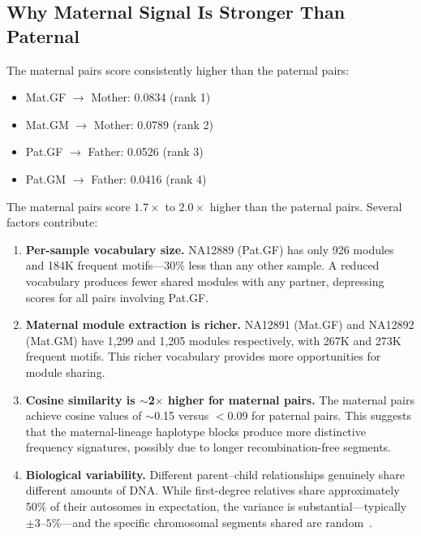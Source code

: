 \documentclass{../yalumba}
\begin{document}
\subsection{Why Maternal Signal Is Stronger Than Paternal}

The maternal pairs score consistently higher than the paternal pairs:

\begin{itemize}
  \item Mat.GF $\to$ Mother: 0.0834 (rank 1)
  \item Mat.GM $\to$ Mother: 0.0789 (rank 2)
  \item Pat.GF $\to$ Father: 0.0526 (rank 3)
  \item Pat.GM $\to$ Father: 0.0416 (rank 4)
\end{itemize}

The maternal pairs score $1.7\times$ to $2.0\times$ higher than the paternal
pairs.  Several factors contribute:

\begin{enumerate}
  \item \textbf{Per-sample vocabulary size.}  NA12889 (Pat.GF) has only
        926 modules and 184K frequent motifs---30\% less than any other sample.
        A reduced vocabulary produces fewer shared modules with any partner,
        depressing scores for all pairs involving Pat.GF.

  \item \textbf{Maternal module extraction is richer.}  NA12891 (Mat.GF)
        and NA12892 (Mat.GM) have 1{,}299 and 1{,}205 modules respectively,
        with 267K and 273K frequent motifs.  This richer vocabulary provides
        more opportunities for module sharing.

  \item \textbf{Cosine similarity is $\sim$2$\times$ higher for maternal
        pairs.}  The maternal pairs achieve cosine values of $\sim$0.15
        versus $<$0.09 for paternal pairs.  This suggests that the
        maternal-lineage haplotype blocks produce more distinctive frequency
        signatures, possibly due to longer recombination-free segments.

  \item \textbf{Biological variability.}  Different parent--child
        relationships genuinely share different amounts of DNA.  While first-degree
        relatives share approximately 50\% of their autosomes in expectation,
        the variance is substantial---typically $\pm 3$--$5\%$---and the
        specific chromosomal segments shared are random~\cite{1000genomes2015}.
\end{enumerate}
\end{document}
